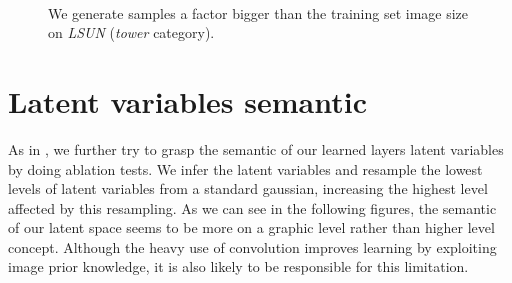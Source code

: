 \documentclass{article}
\begin{document}
\begin{figure}[H]
\vspace{0pt}
    \centering {} \\
    \caption{We generate samples a factor bigger than the training set image size on \emph{LSUN} (\emph{tower} category).}
\vspace{0pt}
\end{figure}

\section{Latent variables semantic}
\label{app:latent}
As in \citep{gregor2016towards}, we further try to grasp the semantic of our learned layers latent variables by doing ablation tests. We infer the latent variables and resample the lowest levels of latent variables from a standard gaussian, increasing the highest level affected by this resampling. As we can see in the following figures, the semantic of our latent space seems to be more on a graphic level rather than higher level concept. Although the heavy use of convolution improves learning by exploiting image prior knowledge, it is also likely to be responsible for this limitation.
\end{document}
